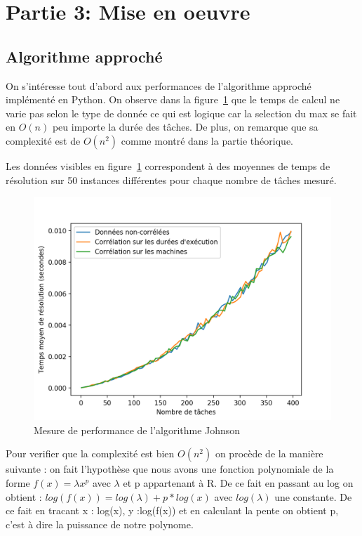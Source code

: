 \documentclass[a4paper, 10pt]{article}
\begin{document}
	\section*{Partie 3: Mise en oeuvre}
		\subsection*{Algorithme approché}
		
		On s'intéresse tout d'abord aux performances de l'algorithme approché implémenté en Python. On observe dans la figure~\ref{fig:tj} que le temps de calcul ne varie pas selon le type de donnée ce qui est logique car la selection du max se fait en $O(n)$ peu importe la durée des tâches. De plus, on remarque que sa complexité est de $O(n^2)$ comme montré dans la partie théorique.
		
		Les données visibles en figure~\ref{fig:tj} correspondent à des moyennes de temps de résolution sur 50 instances différentes pour chaque nombre de tâches mesuré.
		
		\begin{figure}[H]
			\centering
			\includegraphics[width=0.85\linewidth]{graphes/Johnson.png}
			\caption{Mesure de performance de l'algorithme Johnson}
			\label{fig:tj}
		\end{figure}

                Pour verifier que la complexité est bien $O(n^2)$ on procède de la manière suivante : on fait l'hypothèse que nous avons une fonction polynomiale de la forme $f(x) = \lambda x^p$ avec $\lambda$ et p appartenant à R.
                De ce fait en passant au log on obtient : $log(f(x)) = log(\lambda) + p*log(x)$ avec $log(\lambda)$ une constante. De ce fait en tracant x : log(x), y :log(f(x)) et en calculant la pente on obtient p, c'est à dire la puissance de notre polynome.
\end{document}
